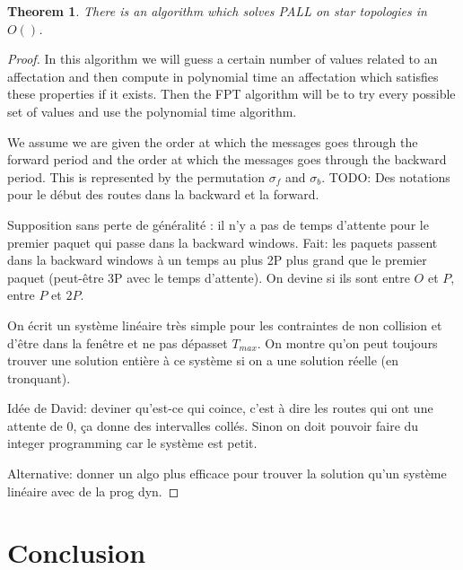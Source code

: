 \documentclass[a4paper,10pt]{article}
\newtheorem{theorem}{Theorem}
\newcommand{\todo}[1]{{\color{red} TODO: {#1}}}
\begin{document}
      
      \begin{theorem}
       There is an algorithm which solves PALL on star topologies in $O( )$.
      \end{theorem}
      \begin{proof}
       In this algorithm we will guess a certain number of values related to an affectation and then compute in polynomial time
       an affectation which satisfies these properties if it exists. Then the FPT algorithm will be to try every possible set of values 
       and use the polynomial time algorithm.
       
       We assume we are given the order at which the messages goes through the forward
       period and the order at which the messages goes through the backward period. 
       This is represented by the permutation $\sigma_f$ and $\sigma_b$. \todo{Des notations pour 
       le début des routes dans la backward et la forward}.
       
       Supposition sans perte de généralité : il n'y a pas de temps d'attente  pour le premier paquet qui passe dans 
       la backward windows.
       Fait: les paquets passent dans la backward windows à un temps au plus 2P plus grand que le premier paquet (peut-être 3P avec
       le temps d'attente). 
       On devine si ils sont entre $O$ et $P$, entre $P$ et $2P$.
       
       On écrit un système linéaire très simple pour les contraintes de non collision et d'être dans la fenêtre
       et ne pas dépasset $T_{max}$.
       On montre qu'on peut toujours trouver une solution entière à ce système si on a une solution réelle (en tronquant).
       
       Idée de David: deviner qu'est-ce qui coince, c'est à dire les routes qui ont une attente de 0, 
       ça donne des intervalles collés.
       Sinon on doit pouvoir faire du integer programming car le système est petit.
       
       Alternative: donner un algo plus efficace pour trouver la solution qu'un système linéaire avec de la prog dyn.
       
      \end{proof}
 
\section{Conclusion}





\end{document}
